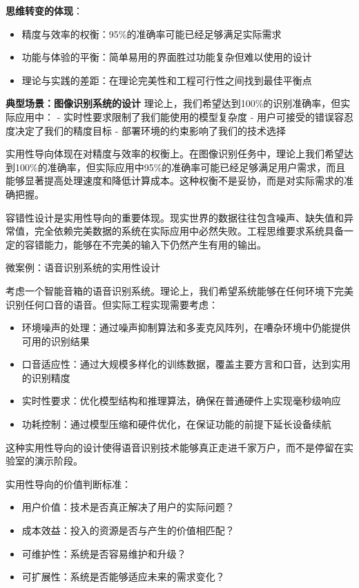 \textbf{思维转变的体现}：
\begin{itemize}
\item 精度与效率的权衡：95\%的准确率可能已经足够满足实际需求
\item 功能与体验的平衡：简单易用的界面胜过功能复杂但难以使用的设计
\item 理论与实践的差距：在理论完美性和工程可行性之间找到最佳平衡点
\end{itemize}

\textbf{典型场景：图像识别系统的设计}
理论上，我们希望达到100\%的识别准确率，但实际应用中：
- 实时性要求限制了我们能使用的模型复杂度
- 用户可接受的错误容忍度决定了我们的精度目标
- 部署环境的约束影响了我们的技术选择

实用性导向体现在对精度与效率的权衡上。在图像识别任务中，理论上我们希望达到100\%的准确率，但实际应用中95\%的准确率可能已经足够满足用户需求，而且能够显著提高处理速度和降低计算成本。这种权衡不是妥协，而是对实际需求的准确把握。

容错性设计是实用性导向的重要体现。现实世界的数据往往包含噪声、缺失值和异常值，完全依赖完美数据的系统在实际应用中必然失败。工程思维要求系统具备一定的容错能力，能够在不完美的输入下仍然产生有用的输出。

微案例：语音识别系统的实用性设计

考虑一个智能音箱的语音识别系统。理论上，我们希望系统能够在任何环境下完美识别任何口音的语音。但实际工程实现需要考虑：

\begin{itemize}
\item 环境噪声的处理：通过噪声抑制算法和多麦克风阵列，在嘈杂环境中仍能提供可用的识别结果
\item 口音适应性：通过大规模多样化的训练数据，覆盖主要方言和口音，达到实用的识别精度
\item 实时性要求：优化模型结构和推理算法，确保在普通硬件上实现毫秒级响应
\item 功耗控制：通过模型压缩和硬件优化，在保证功能的前提下延长设备续航
\end{itemize}

这种实用性导向的设计使得语音识别技术能够真正走进千家万户，而不是停留在实验室的演示阶段。

实用性导向的价值判断标准：

\begin{itemize}
\item 用户价值：技术是否真正解决了用户的实际问题？
\item 成本效益：投入的资源是否与产生的价值相匹配？
\item 可维护性：系统是否容易维护和升级？
\item 可扩展性：系统是否能够适应未来的需求变化？
\end{itemize}

